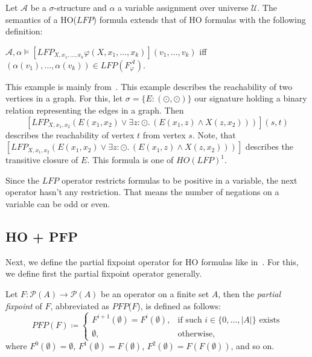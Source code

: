 \begin{definition}
    Let $\mathcal{A}$ be a $\sigma$-structure and $\alpha$ a variable assignment over universe $\mathcal{U}$. The
    semantics of a HO($\mathit{LFP}$) formula extends that of HO formulas with the following definition:
    \begin{compactitem}
        \item $\mathcal{A}, \alpha \models [\mathit{LFP}_{X, x_1, \dots, x_k}\varphi(X, x_1, \dots, x_k)](v_1, \dots,
        v_k)$ iff $(\alpha(v_1), \dots, \alpha(v_k)) \in \mathit{LFP}(F_\varphi^\mathcal{A})$.
    \end{compactitem}
\end{definition}

\begin{example}
    \label{example:ho_lfp}
    This example is mainly from~\cite{freireMartins2011descriptive}. This example describes the reachability of two
    vertices in a graph. For this, let $\sigma = \{E\colon(\odot, \odot)\}$ our signature holding a binary relation
    representing the edges in a graph. Then
    \[[LFP_{X, x_1, x_2}(E(x_1, x_2) \vee \exists z\colon\odot.\,(E(x_1, z) \wedge X(z, x_2)))](s, t)\]
    describes the reachability of vertex $t$ from vertex $s$. Note, that $[LFP_{X, x_1, x_2}(E(x_1, x_2) \vee
    \exists z\colon\odot.\,(E(x_1, z) \wedge X(z, x_2)))]$ describes the transitive closure of $E$. This formula is one of
    $HO(LFP)^1$.
\end{example}

Since the $\mathit{LFP}$ operator restricts formulas to be positive in a variable, the next operator hasn't any
restriction. That means the number of negations on a variable can be odd or even.

\subsection{HO + PFP}\label{subsec:ho+Pfp}

Next, we define the partial fixpoint operator for HO formulas like in~\cite{schewe2006fixpoint}. For this, we define
first the partial fixpoint operator generally.

\begin{definition}
    Let $F\colon \mathscr{P}(A) \rightarrow \mathscr{P}(A)$ be an operator on a finite set $A$, then the \emph{partial
    fixpoint} of $F$, abbreviated as $\mathit{PFP}$($F$), is defined as follows:
    \[\mathit{PFP}(F)\coloneqq\begin{cases}
               F^{i+1}(\emptyset)=F^i(\emptyset),  & \text{if such } i \in \{0,\dots,|A|\} \text{ exists}\\
               \emptyset, & \text{otherwise,}
    \end{cases}\]
    where $F^0(\emptyset) = \emptyset$, $F^1(\emptyset) = F(\emptyset)$, $F^2(\emptyset) = F(F(\emptyset))$, and so on.
\end{definition}


